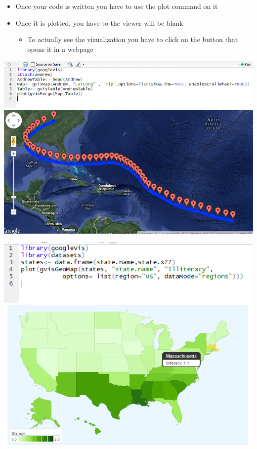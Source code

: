 \documentclass[Madrid]{beamer}\usepackage[]{graphicx}\usepackage[]{color}
\begin{document}
\begin{frame}
\begin{itemize}
\item{Once your code is written you have to use the plot command on it}
\item{Once it is plotted, you have to the viewer will be blank}
\begin{itemize}
\item{To actually see the vizualization you have to click on the button that opens it in a webpage}
\end{itemize}
\end{itemize}
\end{frame}
\begin{frame}
\end{frame}



\begin{frame}
\includegraphics[scale=.5]{MapCode}
 \linebreak
\includegraphics[scale=.35]{map}
\end{frame}

\begin{frame}
\linebreak
\includegraphics[scale=.45]{geocode} \linebreak
{} \linebreak
\includegraphics[scale=.5]{geomap}
\end{frame}
\end{document}
